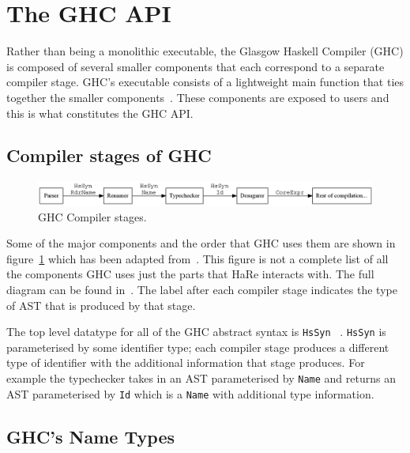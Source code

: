 \section{The GHC API}

Rather than being a monolithic executable, the Glasgow Haskell Compiler (GHC) is composed of several smaller components that each correspond to a separate compiler stage. GHC's executable consists of a lightweight main function that ties together the smaller components~\citep{ghcDesign}. These components are exposed to users  and this is what constitutes the GHC API.

\subsection{Compiler stages of GHC}\label{ghcStages}

\begin{figure}[h]\label{compilerStages}
	\begin{center}
		\includegraphics[scale=.4]{graphVis/Chapter2/compilerStgs.png}
	\end{center}
	\caption{GHC Compiler stages.}
\end{figure}

Some of the major components and the order that GHC uses them are shown in figure~\ref{compilerStages} which has been adapted from~\citep{ghcDesign}. This figure is not a complete list of all the components GHC uses just the parts that HaRe interacts with. The full diagram can be found in~\citep{ghcDesign}. The label after each compiler stage indicates the type of AST that is produced by that stage.

The top level datatype for all of the GHC abstract syntax is \texttt{HsSyn} ~\citep{ghcDesign}. \texttt{HsSyn} is parameterised by some identifier type; each compiler stage produces a different type of identifier with the additional information that stage produces. For example the typechecker takes in an AST parameterised by \texttt{Name} and returns an AST parameterised by \texttt{Id} which is a \texttt{Name} with additional type information.

\subsection{GHC's Name Types}\label{ghcNames}

